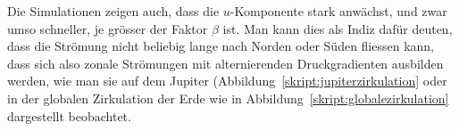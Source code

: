 Die Simulationen zeigen auch, dass die $u$-Komponente stark anwächst,
und zwar umso schneller, je grösser der Faktor $\beta$ ist.
Man kann dies als Indiz dafür deuten, dass die Strömung nicht beliebig
lange nach Norden oder Süden fliessen kann, dass sich also zonale
Strömungen mit alternierenden Druckgradienten ausbilden werden, wie man
sie auf dem Jupiter (Abbildung~\ref{skript:jupiterzirkulation} oder
in der globalen Zirkulation der Erde wie in
Abbildung~\ref{skript:globalezirkulation} dargestellt beobachtet.


